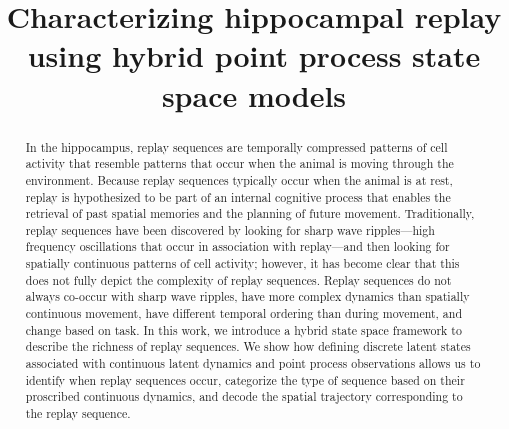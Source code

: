 \documentclass[conference]{IEEEtran}
\begin{document}
\title{Characterizing hippocampal replay using hybrid point process state space models}

\author{
\and
{}
\and
{}

}

\maketitle

\begin{abstract}
In the hippocampus, replay sequences are temporally compressed patterns of cell activity that resemble patterns that occur when the animal is moving through the environment. Because replay sequences typically occur when the animal is at rest, replay is hypothesized to be part of an internal cognitive process that enables the retrieval of past spatial memories and the planning of future movement. Traditionally, replay sequences have been discovered by looking for sharp wave ripples---high frequency oscillations that occur in association with replay---and then looking for spatially continuous patterns of cell activity; however, it has become clear that this does not fully depict the complexity of replay sequences. Replay sequences do not always co-occur with sharp wave ripples, have more complex dynamics than spatially continuous movement, have different temporal ordering than during movement, and change based on task. In this work, we introduce a hybrid state space framework to describe the richness of replay sequences. We show how defining discrete latent states associated with continuous latent dynamics and point process observations allows us to identify when replay sequences occur, categorize the type of sequence based on their proscribed continuous dynamics, and decode the spatial trajectory corresponding to the replay sequence.

\end{abstract}
\end{document}
